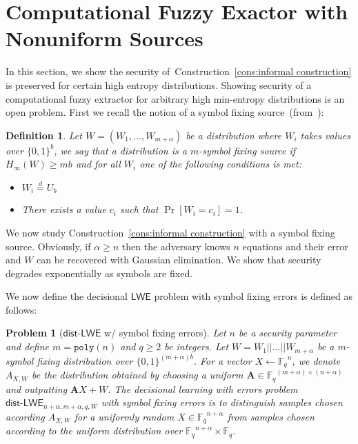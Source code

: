 \documentclass[11pt]{article}
\newcommand{\consref}[1]{\mbox{Construction~\ref{#1}}}
\newcommand{\class}[1]{{\ensuremath{\mathsf{#1}}}}
\newcommand{\vect}[1]{\ensuremath{\textbf{#1}}}
\newcommand{\Fq}{\ensuremath{\mathbb{F}_q}}
\newcommand{\poly}{\ensuremath{\mathtt{poly}}\xspace}
\newcommand{\LWE}{\class{LWE}}
\newcommand{\distLWE}{\ensuremath{\class{dist\mbox{-}LWE}}}
\newtheorem{definition}[theorem]{Definition}
\newtheorem{assumption}[theorem]{Assumption}
\newtheorem{problem}[theorem]{Problem}
\newcommand{\vA}{\vect{A}}
\newcommand{\ignore}[1]{}
\begin{document}
\section{Computational Fuzzy Exactor with Nonuniform Sources}
\label{sec:LWE block fixing sources}
In this section, we show the security of~\consref{cons:informal construction} is preserved for certain high entropy distributions.  Showing security of a computational fuzzy extractor for arbitrary high min-entropy distributions is an open problem.  First we recall the notion of a symbol fixing source~(from~\cite{KZ07}): 
\begin{definition}
Let $W = (W_1,..., W_{m+\alpha})$ be a distribution where $W_i$ takes values over $\{0,1\}^b$, we say that a distribution is a $m$-\emph{symbol fixing source} if $H_\infty(W)\geq mb$ and for all $W_i$ one of the following conditions is met:
\begin{itemize}
\item $W_i \overset{d}= U_b$
\item There exists a value $c_i$ such that $\Pr[W_i = c_i] =1$.
\end{itemize}
\end{definition}

We now study \consref{cons:informal construction} with a symbol fixing source.  Obviously, if $\alpha \geq n$ then the adversary knows $n$ equations and their error and $W$ can be recovered with Gaussian elimination.  We show that security degrades exponentially as symbols are fixed.
\ignore{
\begin{assumption}[LWE w/ entropic errors]
Let $n$ be a security parameter and define $m = \poly(n)$ and $q\geq 2$ be integers.  Let $W = W_1||...||W_{m+\alpha}$ be a $m$-block fixing distribution over $\{0,1\}^{(m+\alpha)\ell}$. For a vector 
Let $A\in\Fq^{(m+\alpha)\times (n+\alpha)}$ and let $x\in\Fq^{n+\alpha}$.  No PPT algorithm given $Ax+W$ can recover $x$ with probability greater than nonnegligible.
\end{assumption}
}
We now define the decisional $\LWE$ problem with symbol fixing errors is defined as follows: 
\begin{problem}[$\distLWE$ w/ symbol fixing errors]
Let $n$ be a security parameter and define $m = \poly(n)$ and $q\geq 2$ be integers.  Let $W = W_1||...||W_{m+\alpha}$ be a $m$-symbol fixing distribution over $\{0,1\}^{(m+\alpha)b}$. For a vector $X \leftarrow \Fq^n$, we denote $A_{X, W}$ be the distribution obtained by choosing a uniform $\vA\in\Fq^{(m+\alpha)\times (n+\alpha)}$ and outputting $\vA X + W$. The decisional learning with errors problem $\distLWE_{n+\alpha, m+\alpha, q, W}$ with symbol fixing errors is to distinguish samples chosen according $A_{X, W}$ for a uniformly random $X \in \Fq^{n+\alpha}$ from samples chosen according to the uniform distribution over $\Fq^{n+\alpha} \times \Fq$.
\end{problem}
\end{document}
